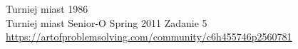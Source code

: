 
 Turniej miast 1986 \\
 Turniej miast Senior-O Spring 2011 Zadanie 5 \\
 \url{https://artofproblemsolving.com/community/c6h455746p2560781}\\